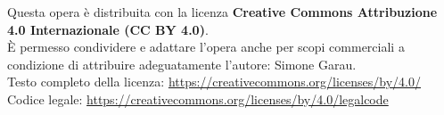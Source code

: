 \clearpage
\thispagestyle{empty}
\begin{center}
  {\small Questa opera è distribuita con la licenza \textbf{Creative Commons Attribuzione 4.0 Internazionale (CC BY 4.0)}.\\
  È permesso condividere e adattare l'opera anche per scopi commerciali a condizione di attribuire adeguatamente l'autore: Simone Garau.\\
  Testo completo della licenza: \url{https://creativecommons.org/licenses/by/4.0/}\\
  Codice legale: \url{https://creativecommons.org/licenses/by/4.0/legalcode}}
\end{center}
\clearpage
